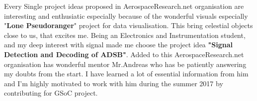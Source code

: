 \documentclass[11pt,a4paper]{report}
\begin{document}
Every Single project ideas proposed in AerospaceResearch.net organisation are interesting and enthusiatic especially because of the wonderful visuals especially "\textbf{Lone Pseudoranger}" project for data visualisation. This bring celestial objects close to us, that excites me. Being an Electronics and Instrumentation student, and my deep interest with signal made me choose the project idea  \textbf{"Signal Detection and Decoding of ADSB"}. Added to this AerospaceResearch.net organisation has wonderful mentor Mr.Andreas who has be patiently answering my doubts from the start. I have learned a lot of essential information from him and I'm highly motivated to work with him during the summer 2017 by contributing for GSoC project. 

  

            
\end{document}
